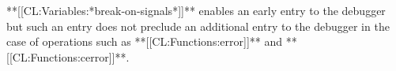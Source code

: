 **[[CL:Variables:*break-on-signals*]]** enables an early entry to the debugger but such an entry does not preclude an additional entry to the debugger in the case of operations such as **[[CL:Functions:error]]** and **[[CL:Functions:cerror]]**.

 
